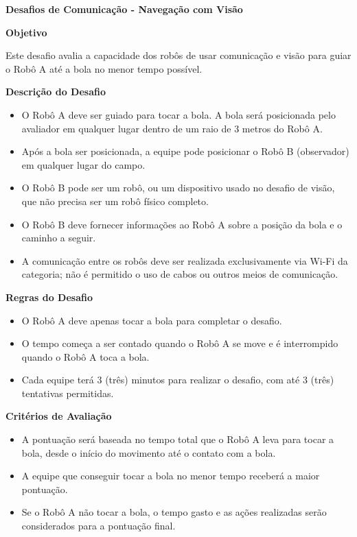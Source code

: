 \clearpage
\sffamily
{\bfseries\color[rgb]{0.4,0.4,0.4}Desafios de Comunicação - Navegação com Visão}
{}

\bigskip

{\bfseries Objetivo}

\headlinebox

Este desafio avalia a capacidade dos robôs de usar comunicação e visão para guiar o Robô A até a bola no menor tempo possível.

\bigskip

{\bfseries Descrição do Desafio}

\headlinebox

\begin{itemize}
	\item O Robô A deve ser guiado para tocar a bola. A bola será posicionada pelo avaliador em qualquer lugar dentro de um raio de 3 metros do Robô A.
	\item Após a bola ser posicionada, a equipe pode posicionar o Robô B (observador) em qualquer lugar do campo.
	\item O Robô B pode ser um robô, ou um dispositivo usado no desafio de visão, que não precisa ser um robô físico completo.
	\item O Robô B deve fornecer informações ao Robô A sobre a posição da bola e o caminho a seguir.
	\item A comunicação entre os robôs deve ser realizada exclusivamente via Wi-Fi da categoria; não é permitido o uso de cabos ou outros meios de comunicação.
\end{itemize}

\bigskip

{\bfseries Regras do Desafio}

\headlinebox
\begin{itemize}
	\item O Robô A deve apenas tocar a bola para completar o desafio.
	\item O tempo começa a ser contado quando o Robô A se move e é interrompido quando o Robô A toca a bola.
	\item Cada equipe terá 3 (três) minutos para realizar o desafio, com até 3 (três) tentativas permitidas.
\end{itemize}

\bigskip

{\bfseries Critérios de Avaliação}

\headlinebox

\begin{itemize}
	\item A pontuação será baseada no tempo total que o Robô A leva para tocar a bola, desde o início do movimento até o contato com a bola.
	\item A equipe que conseguir tocar a bola no menor tempo receberá a maior pontuação.
	\item Se o Robô A não tocar a bola, o tempo gasto e as ações realizadas serão considerados para a pontuação final.
\end{itemize}